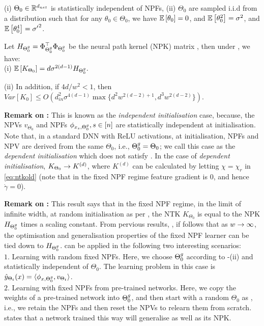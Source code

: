 \begin{assumption}\label{assmp:main}
(i) $\Theta_0\in\mathbb{R}^{d_{net}}$ is statistically independent of NPFs, (ii) $\Theta_0$ are sampled i.i.d from a distribution such that for any $\theta_0\in\Theta_0$,  we have $\mathbb{E}\left[\theta_0\right]=0$, and  $\mathbb{E}\left[\theta^2_0\right]=\sigma^2$, and $\mathbb{E}\left[\theta^4_0\right]={\sigma'}^2$.
\end{assumption}
\begin{theorem}\label{th:main} Let $H_{{\Theta}^g_0}=\Phi^\top_{{\Theta}^g_0}\Phi_{{\Theta}^g_0}$ be the neural path kernel (NPK) matrix , then under , we have:\\
(i) $\mathbb{E}\left[K_{\Theta_0}\right]=d\sigma^{2(d-1)} H_{{\Theta}^g_0}.$

(ii) In addition, if ${4d}/{w^2}<1$, then $Var\left[K_0\right]\leq O\left(d^2_{in}\sigma^{4(d-1)}\max\{d^2w^{2(d-2)+1}, d^3w^{2(d-2)}\}\right)$.
\end{theorem}
\textbf{Remark on :} This is known as the \emph{independent initialisation} case, because, the NPVs $v_{\Theta_0}$ and NPFs $\phi_{x_s,{\Theta}^g_0},s\in[n]$ are statistically independent at initialisation. Note that, in a standard DNN with ReLU activations, at initialisation, NPFs and NPV are derived from the same $\Theta_0$, i.e., ${\Theta}^g_0=\Theta_0$; we call this case as the \emph{dependent initialisation} which does not satisfy . In the case of \emph{dependent initialisation}, $K_{\Theta_0}\rightarrow K^{(d)}$, where $K^{(d)}$ can be calculated by letting $\chi=\chi_{r}$ in \eqref{eq:ntkold} (note that in the fixed NPF regime feature gradient is $0$, and hence $\dot{\gamma}=0$).

\textbf{Remark on :} This result says that in the fixed NPF regime, in the limit of infinite width, at random initialisation as per , the NTK $K_{\Theta_0}$ is equal to the NPK $H_{{\Theta}^g_0}$ times a scaling constant. From pervious results, \cite{arora2019exact,cao2019generalization}, if follows that as $w\rightarrow\infty$, the optimisation and generalisation properties of the fixed NPF learner can be tied down to $H_{{\Theta}^g_0}$.  can be applied in the following two interesting scenarios:\\
$1.$ Learning with random fixed NPFs. Here, we choose ${\Theta}^g_0$ according to -(ii) and statistically independent of $\Theta_0$. The learning problem in this case is $\hat{y}_{\Theta_t}(x)=\langle \phi_{x,{\Theta}^g_0},v_{\Theta_t}\rangle$.\\
$2.$ Learning with fixed NPFs from pre-trained networks. Here, we copy the weights of a pre-trained network into ${\Theta}^g_0$, and then start with a random $\Theta_0$ as , i.e., we retain the NPFs and then reset the NPVs to relearn them from scratch.  states that a network trained this way will generalise as well as its NPK.

